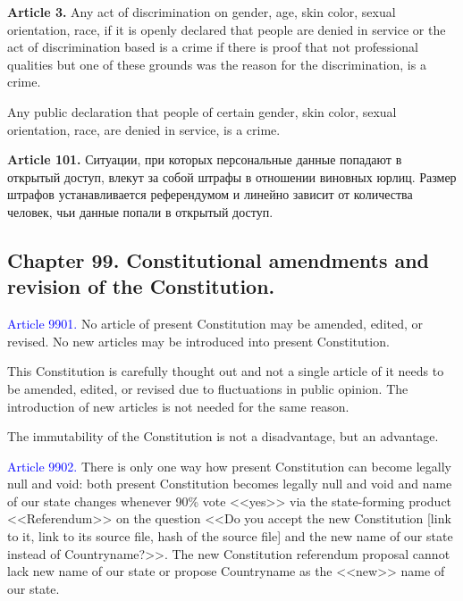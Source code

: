 \documentclass[11pt]{article}
\theoremstyle{remark}
\theoremstyle{definition}
\begin{document}
\textbf{Article 3.} Any act of discrimination on gender, age, skin color, sexual orientation, race, if it is openly declared that people are denied in service or  the act of discrimination based  is a crime if there is proof that not professional qualities but one of these grounds was the reason for the discrimination, is a crime.

Any public declaration that people of certain gender, skin color, sexual orientation, race, are denied in service, is a crime.




\textbf{Article 101.} Ситуации, при которых персональные данные попадают в открытый доступ, влекут за собой штрафы в отношении виновных юрлиц. Размер штрафов устанавливается референдумом и линейно зависит от количества человек, чьи данные попали в открытый доступ.















\subsection*{Chapter 99. Constitutional amendments and revision of the Constitution.}


\textcolor{blue}{Article 9901.} No article of present Constitution may be amended, edited, or revised. No new articles may be introduced into present Constitution.

\color{blue}


This Constitution is carefully thought out and not a single article of it needs to be amended, edited, or revised due to fluctuations in public opinion. The introduction of new articles is not needed for the same reason.

The immutability of the Constitution is not a disadvantage, but an advantage.



\color{black}


\textcolor{blue}{Article 9902.} There is only one way how present Constitution can become legally null and void: both present Constitution becomes legally null and void and name of our state changes whenever 90\% vote <<yes>> via the state-forming product <<Referendum>> on the question <<Do you accept the new Constitution [link to it, link to its source file, hash of the source file] and the new name of our state instead of Countryname?>>. The new Constitution referendum proposal cannot lack new name of our state or propose Countryname as the <<new>> name of our state. 
\end{document}
